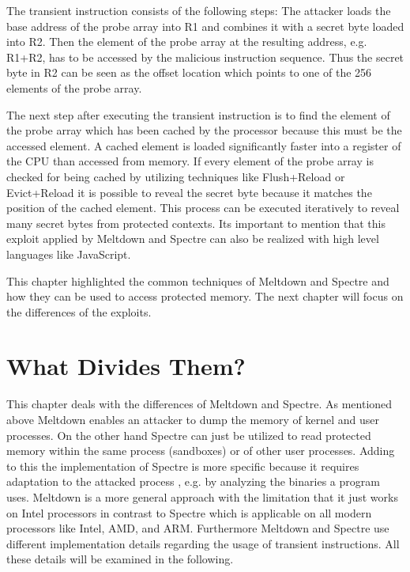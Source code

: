 \documentclass[a4paper,oneside,openright] {scrreprt}
\begin{document}
The transient instruction consists of the following steps:
The attacker loads the base address of the probe array into R1 and combines it with a secret byte loaded into R2. 
Then the element of the probe array at the resulting address, e.g. R1+R2, has to be accessed by the malicious instruction sequence.
Thus the secret byte in R2 can be seen as the offset location which points to one of the 256 elements of the probe array.

The next step after executing the transient instruction is to find the element of the probe array which has been cached by the processor
because this must be the accessed element.
A cached element is loaded significantly faster into a register of the CPU than accessed from memory.
If every element of the probe array is checked for being cached by utilizing techniques like Flush+Reload or Evict+Reload it is possible
to reveal the secret byte because it matches the position of the cached element.
This process can be executed iteratively to reveal many secret bytes from protected contexts. Its important to mention that this exploit
applied by Meltdown and Spectre can also be realized with high level languages like JavaScript.

This chapter highlighted the common techniques of Meltdown and Spectre and how they can be used to access protected memory.
The next chapter will focus on the differences of the exploits.

\section{What Divides Them?}
\label{ch:intro:motivation}

This chapter deals with the differences of Meltdown and Spectre. As mentioned above Meltdown enables an attacker 
to dump the memory of kernel and user processes. On the other hand Spectre can just be utilized to read protected memory within 
the same process (sandboxes) or of other user processes.
Adding to this the implementation of Spectre is more specific because it requires adaptation to the attacked process 
, e.g. by analyzing the binaries a program uses. Meltdown is a more general approach with the limitation that it just works on Intel
 processors in contrast to Spectre which is applicable on all modern processors like Intel, AMD, and ARM. Furthermore Meltdown and 
 Spectre use different implementation details regarding the usage of transient instructions. 
 All these details will be examined in the following.
\end{document}
